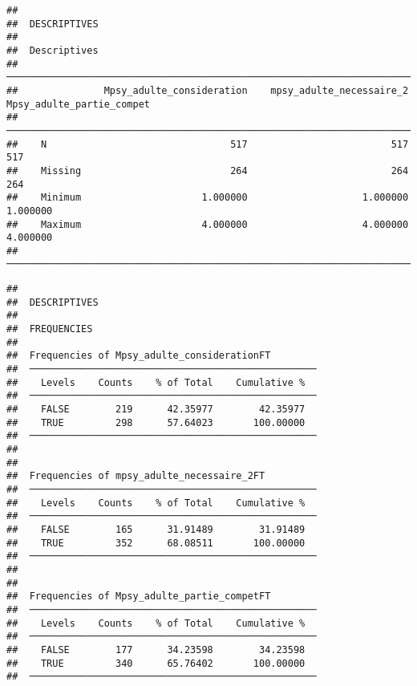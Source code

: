 \documentclass[
]{article}
\begin{document}
\begin{verbatim}
## 
##  DESCRIPTIVES
## 
##  Descriptives                                                                                      
##  ───────────────────────────────────────────────────────────────────────────────────────────────── 
##               Mpsy_adulte_consideration    mpsy_adulte_necessaire_2    Mpsy_adulte_partie_compet   
##  ───────────────────────────────────────────────────────────────────────────────────────────────── 
##    N                                517                         517                          517   
##    Missing                          264                         264                          264   
##    Minimum                     1.000000                    1.000000                     1.000000   
##    Maximum                     4.000000                    4.000000                     4.000000   
##  ─────────────────────────────────────────────────────────────────────────────────────────────────
\end{verbatim}

\begin{verbatim}
## 
##  DESCRIPTIVES
## 
##  FREQUENCIES
## 
##  Frequencies of Mpsy_adulte_considerationFT         
##  ────────────────────────────────────────────────── 
##    Levels    Counts    % of Total    Cumulative %   
##  ────────────────────────────────────────────────── 
##    FALSE        219      42.35977        42.35977   
##    TRUE         298      57.64023       100.00000   
##  ────────────────────────────────────────────────── 
## 
## 
##  Frequencies of mpsy_adulte_necessaire_2FT          
##  ────────────────────────────────────────────────── 
##    Levels    Counts    % of Total    Cumulative %   
##  ────────────────────────────────────────────────── 
##    FALSE        165      31.91489        31.91489   
##    TRUE         352      68.08511       100.00000   
##  ────────────────────────────────────────────────── 
## 
## 
##  Frequencies of Mpsy_adulte_partie_competFT         
##  ────────────────────────────────────────────────── 
##    Levels    Counts    % of Total    Cumulative %   
##  ────────────────────────────────────────────────── 
##    FALSE        177      34.23598        34.23598   
##    TRUE         340      65.76402       100.00000   
##  ──────────────────────────────────────────────────
\end{verbatim}
\end{document}
